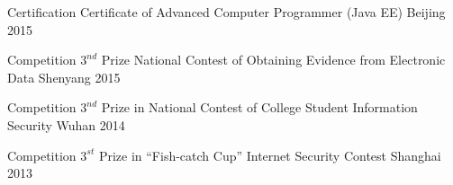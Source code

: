 \begin{cvhonors}
  \cvhonor
    {Certification}
    {Certificate of Advanced Computer Programmer (Java EE)}
    {Beijing}
    {2015}
    
  \cvhonor
    {Competition}
    {$3^{nd}$ Prize National Contest of Obtaining Evidence from Electronic Data}
    {Shenyang}
    {2015}

    
  \cvhonor
    {Competition}
    {$3^{nd}$ Prize in National Contest of College Student Information Security}
    {Wuhan}
    {2014}
    
  \cvhonor
    {Competition}
    {$3^{st}$ Prize in “Fish-catch Cup” Internet Security Contest}
    {Shanghai}
    {2013}
\end{cvhonors}


